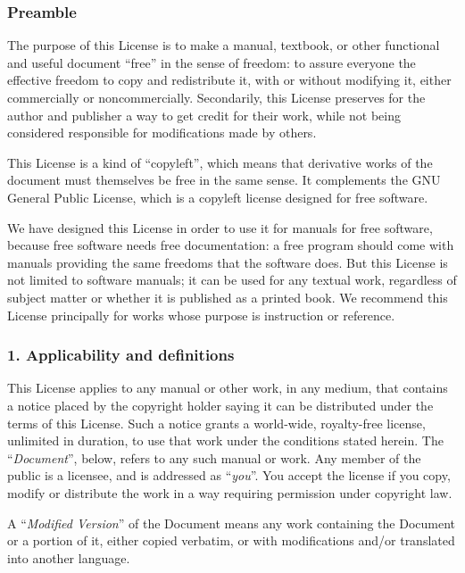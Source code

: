 \documentclass[a4paper,openany]{book}
\begin{document}
\begin{results}
\tiny

\subsubsection*{Preamble}

The purpose of this License is to make a manual, textbook, or other
functional and useful document ``free'' in the sense of freedom: to
assure everyone the effective freedom to copy and redistribute it,
with or without modifying it, either commercially or noncommercially.
Secondarily, this License preserves for the author and publisher a way
to get credit for their work, while not being considered responsible
for modifications made by others.

This License is a kind of ``copyleft'', which means that derivative
works of the document must themselves be free in the same sense.  It
complements the GNU General Public License, which is a copyleft
license designed for free software.

We have designed this License in order to use it for manuals for free
software, because free software needs free documentation: a free
program should come with manuals providing the same freedoms that the
software does.  But this License is not limited to software manuals;
it can be used for any textual work, regardless of subject matter or
whether it is published as a printed book.  We recommend this License
principally for works whose purpose is instruction or reference.

\subsubsection*{1. Applicability and definitions}

This License applies to any manual or other work, in any medium, that
contains a notice placed by the copyright holder saying it can be
distributed under the terms of this License.  Such a notice grants a
world-wide, royalty-free license, unlimited in duration, to use that
work under the conditions stated herein.  The ``\emph{Document}'', below,
refers to any such manual or work.  Any member of the public is a
licensee, and is addressed as ``\emph{you}''.  You accept the license if you
copy, modify or distribute the work in a way requiring permission
under copyright law.

A ``\emph{Modified Version}'' of the Document means any work containing the
Document or a portion of it, either copied verbatim, or with
modifications and/or translated into another language.


\end{results}
\end{document}
